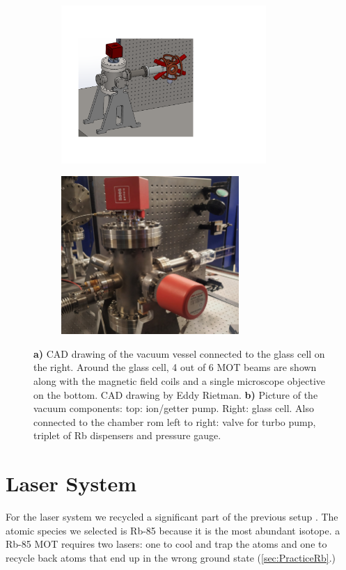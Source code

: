 \begin{figure}
	\begin{subfigure}{.54\linewidth}
		\centering
		\includegraphics[height=6cm]{figures/Vacuum.pdf}
		\caption{}
		\label{fig:VacuumSetup}
	\end{subfigure}
	\hfill
	\begin{subfigure}{.44\linewidth}
		\centering
		\includegraphics[height=6cm]{figures/Chamber.jpg}
		\caption{}
		\label{fig:Chamber}
	\end{subfigure}
	\caption{\textbf{a)} CAD drawing of the vacuum vessel connected to the glass cell on the right. 
	Around the glass cell, 4 out of 6 MOT beams are shown along with the magnetic field coils and a single microscope objective on the bottom. 
	CAD drawing by Eddy Rietman.
	\textbf{b)} Picture of the vacuum components: top: ion/getter pump. Right: glass cell. Also connected to the chamber rom left to right: valve for turbo pump, triplet of Rb dispensers and pressure gauge.}
\end{figure}

\section{Laser System}\label{sec:LaserSystem}

For the laser system we recycled a significant part of the previous setup \cite{Reijnders2010}.
The atomic species we selected is Rb-85 because it is the most abundant isotope. 
a Rb-85 MOT requires two lasers: one to cool and trap the atoms and one to recycle back atoms that end up in the wrong ground state (\cref{sec:PracticeRb}.)

